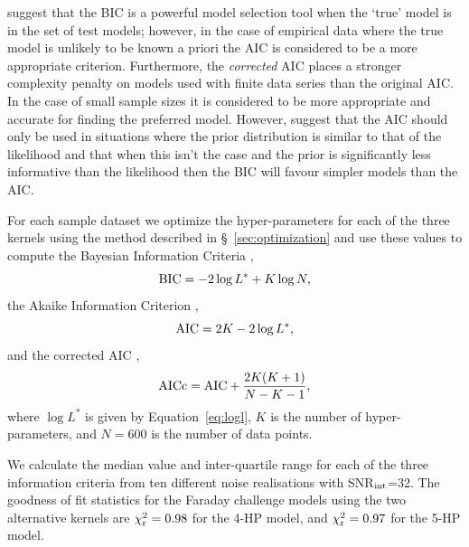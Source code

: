 \documentclass[fleqn,usenatbib]{mnras}
\begin{document}
\cite{burnham} suggest that the  BIC is  a powerful model selection tool when the `true' model is in the set of test models; however, in the case of empirical data where the true model is unlikely to be known a priori the AIC is considered to be a more appropriate criterion. Furthermore, the \emph{corrected} AIC places a stronger complexity penalty on models used with finite data series than the original AIC. In the case of small sample sizes it is considered to be more appropriate and accurate for finding the preferred model. However, \cite{kassrafferty} suggest that the AIC should only be used in situations where the prior distribution is similar to that of the likelihood and that when this isn't the case and the prior is significantly less informative than the likelihood then the BIC will favour simpler models than the AIC. 

For each sample dataset we optimize the hyper-parameters for each of the three kernels using the method described in \S~\ref{sec:optimization} and use these values to compute the Bayesian Information Criteria \citep[BIC;][]{1978AnSta...6..461S},
%
\begin{equation}
{\rm BIC} = -2 \log L^\ast + K \log N,
\end{equation}
%
the Akaike Information Criterion \citep[AIC;][]{AIC},
%
\begin{equation}
{\rm AIC} = 2 K - 2\log L^\ast,
\end{equation}
%
and the corrected AIC \citep[AICc;][]{AICc},
%
\begin{equation}
{\rm AICc} = {\rm AIC} + \frac{2K(K+1)}{N - K - 1},
\end{equation}
%
where $\log L^\ast$ is given by Equation~\ref{eq:logl}, $K$ is the number of hyper-parameters, and $N=600$ is the number of data points.

We calculate the median value and inter-quartile range for each of the three information criteria from ten different noise realisations with SNR$_{\rm int}$=32. 
%
The goodness of fit statistics for the Faraday challenge models using the two alternative kernels are $\chi^2_{\rm r} = 0.98$ for the 4-HP model, and $\chi^2_{\rm r} = 0.97$ for the 5-HP model.
\end{document}
